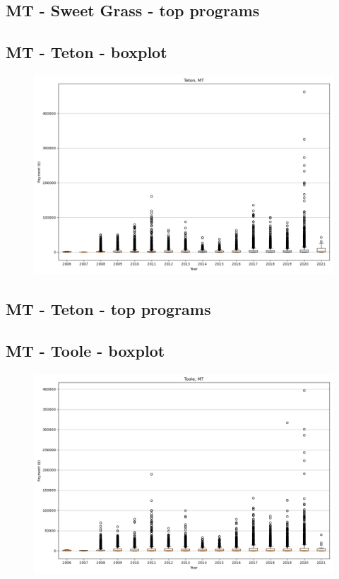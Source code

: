 \subsection*{MT - Sweet Grass - top programs}

\newpage
\subsection*{MT - Teton - boxplot}
\begin{figure}[h]
\centering
\includegraphics[width=7in]{../output/boxplots/counties/Teton-MT_boxplot.png}
\end{figure}


\subsection*{MT - Teton - top programs}

\newpage
\subsection*{MT - Toole - boxplot}
\begin{figure}[h]
\centering
\includegraphics[width=7in]{../output/boxplots/counties/Toole-MT_boxplot.png}
\end{figure}



